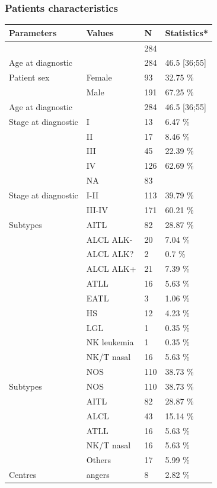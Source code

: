 \documentclass[a4paper,11pt] {article}
\begin{document}
 \subsubsection{Patients characteristics}
\begin{longtable}{llll}
  \hline
Parameters & Values & N & Statistics* \\ 
  \hline
 &  & 284 &  \\ 
  Age at diagnostic &  & 284 & 46.5 [36;55] \\ 
  Patient sex & Female & 93 & 32.75 \% \\ 
   & Male & 191 & 67.25 \% \\ 
  Age at diagnostic &  & 284 & 46.5 [36;55] \\ 
  Stage at diagnostic & I & 13 & 6.47 \% \\ 
   & II & 17 & 8.46 \% \\ 
   & III & 45 & 22.39 \% \\ 
   & IV & 126 & 62.69 \% \\ 
   & NA & 83 &  \\ 
  Stage at diagnostic & I-II & 113 & 39.79 \% \\ 
   & III-IV & 171 & 60.21 \% \\ 
  Subtypes & AITL & 82 & 28.87 \% \\ 
   & ALCL ALK- & 20 & 7.04 \% \\ 
   & ALCL ALK? & 2 & 0.7 \% \\ 
   & ALCL ALK+ & 21 & 7.39 \% \\ 
   & ATLL & 16 & 5.63 \% \\ 
   & EATL & 3 & 1.06 \% \\ 
   & HS & 12 & 4.23 \% \\ 
   & LGL & 1 & 0.35 \% \\ 
   & NK leukemia & 1 & 0.35 \% \\ 
   & NK/T nasal & 16 & 5.63 \% \\ 
   & NOS & 110 & 38.73 \% \\ 
  Subtypes & NOS & 110 & 38.73 \% \\ 
   & AITL & 82 & 28.87 \% \\ 
   & ALCL & 43 & 15.14 \% \\ 
   & ATLL & 16 & 5.63 \% \\ 
   & NK/T nasal & 16 & 5.63 \% \\ 
   & Others & 17 & 5.99 \% \\ 
  Centres & angers & 8 & 2.82 \% \\ 

\end{longtable}
\end{document}
